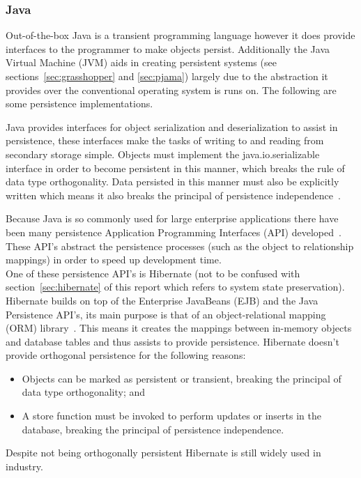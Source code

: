 \documentclass[a4paper,12pt]{article}
\begin{document}
\subsubsection{Java}
Out-of-the-box Java is a transient programming language however it does provide interfaces to the programmer to make objects persist. Additionally the Java Virtual Machine (JVM) aids in creating persistent systems (see sections~\ref{sec:grasshopper} and \ref{sec:pjama}) largely due to the abstraction it provides over the conventional operating system is runs on. The following are some persistence implementations.
\par
Java provides interfaces for object serialization and deserialization to assist in persistence, these interfaces make the tasks of writing to and reading from secondary storage simple. Objects must implement the java.io.serializable interface in order to become persistent in this manner, which breaks the rule of data type orthogonality. Data persisted in this manner must also be explicitly written which means it also breaks the principal of persistence independence~\citep{ADearle}.
\par
\label{sec:javahibernate}
Because Java is so commonly used for large enterprise applications there have been many persistence Application Programming Interfaces (API) developed~\citep{persistenceandjava}. These API's abstract the persistence processes (such as the object to relationship mappings) in order to speed up development time. 
\\One of these persistence API's is Hibernate (not to be confused with section~\ref{sec:hibernate} of this report which refers to system state preservation). Hibernate builds on top of the Enterprise JavaBeans (EJB) and the Java Persistence API's, its main purpose is that of an object-relational mapping (ORM) library~\citep{hibernateORM}. This means it creates the mappings between in-memory objects and database tables and thus assists to provide persistence. Hibernate doesn't provide orthogonal persistence for the following reasons:
\begin{itemize}
    \item{Objects can be marked as persistent or transient, breaking the principal of data type orthogonality; and}
    \item{A store function must be invoked to perform updates or inserts in the database, breaking the principal of persistence independence.}
\end{itemize}
Despite not being orthogonally persistent Hibernate is still widely used in industry.
\end{document}
